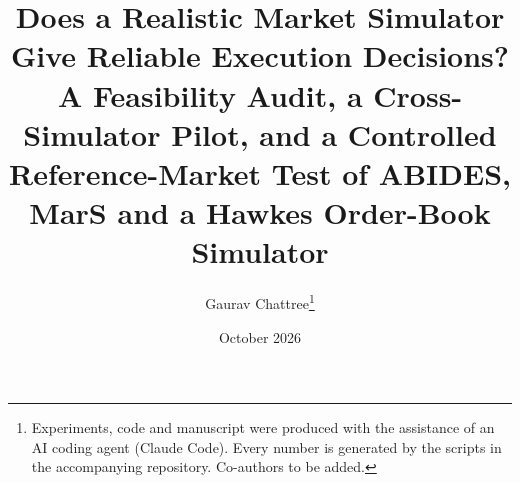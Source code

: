 \documentclass[11pt]{article}
\title{Does a Realistic Market Simulator Give Reliable Execution Decisions?\\[4pt]
\large A Feasibility Audit, a Cross-Simulator Pilot, and a Controlled Reference-Market Test of ABIDES, MarS and a Hawkes Order-Book Simulator}
\author{Gaurav Chattree\thanks{Experiments, code and manuscript were produced with the assistance of an AI coding agent (Claude Code). Every number is generated by the scripts in the accompanying repository. Co-authors to be added.}}
\date{October 2026}
\begin{document}
\maketitle
\begin{abstract}

\end{abstract}







\appendix

\end{document}
